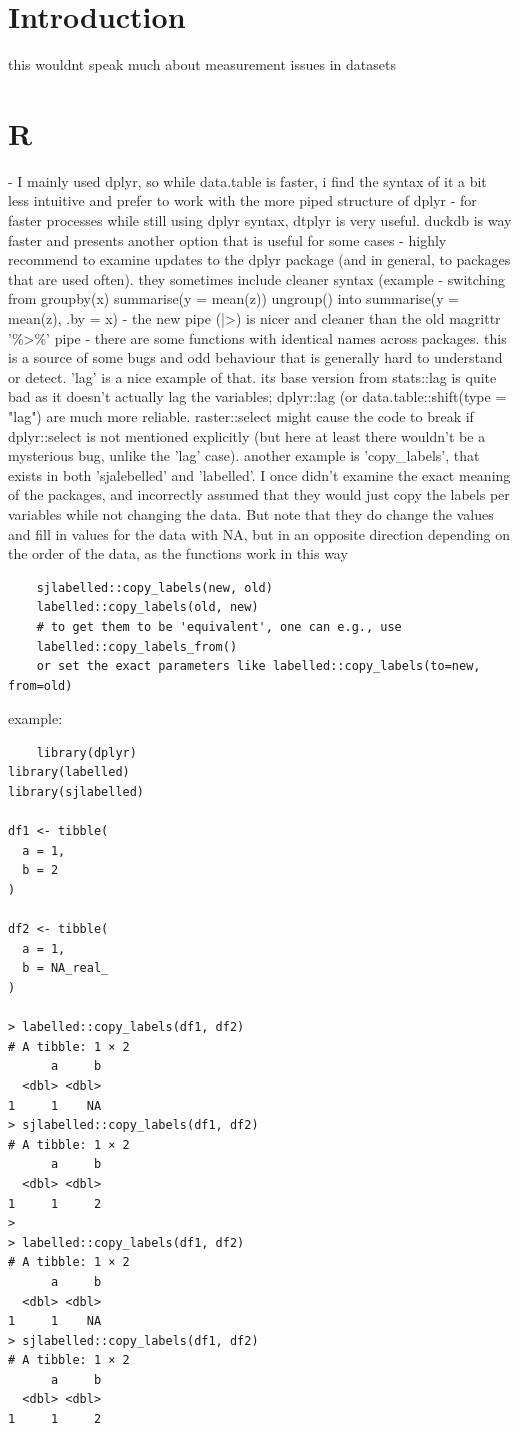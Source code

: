 
\section{Introduction}

this wouldnt speak much about measurement issues in datasets

\section{R}

- I mainly used dplyr, so while data.table is faster, i find the syntax of it a bit less intuitive and prefer to work with the more piped structure of dplyr
- for faster processes while still using dplyr syntax, dtplyr is very useful. duckdb is way faster and presents another option that is useful for some cases
- highly recommend to examine updates to the dplyr package (and in general, to packages that are used often). they sometimes include cleaner syntax (example - switching from groupby(x) summarise(y = mean(z)) ungroup() into summarise(y = mean(z), .by = x)
- the new pipe (|>) is nicer and cleaner than the old magrittr '\%>\%' pipe
- there are some functions with identical names across packages. this is a source of some bugs and odd behaviour that is generally hard to understand or detect. 'lag' is a nice example of that. its base version from stats::lag is quite bad as it doesn't actually lag the variables; dplyr::lag (or data.table::shift(type = "lag") are much more reliable. raster::select might cause the code to break if dplyr::select is not mentioned explicitly (but here at least there wouldn't be a mysterious bug, unlike the 'lag' case). another example is 'copy\_labels', that exists in both 'sjalebelled' and 'labelled'. I once didn't examine the exact meaning of the packages, and incorrectly assumed that they would just copy the labels per variables while not changing the data.
But note that they do change the values and fill in values for the data with NA, but in an opposite direction depending on the order of the data, as the functions work in this way
\begin{verbatim}
    sjlabelled::copy_labels(new, old)
    labelled::copy_labels(old, new)
    # to get them to be 'equivalent', one can e.g., use
    labelled::copy_labels_from()
    or set the exact parameters like labelled::copy_labels(to=new, from=old) 
\end{verbatim}
example:
\begin{verbatim}
    library(dplyr)
library(labelled)
library(sjlabelled)

df1 <- tibble(
  a = 1,
  b = 2
) 

df2 <- tibble(
  a = 1,
  b = NA_real_
)

> labelled::copy_labels(df1, df2)
# A tibble: 1 × 2
      a     b
  <dbl> <dbl>
1     1    NA
> sjlabelled::copy_labels(df1, df2)
# A tibble: 1 × 2
      a     b
  <dbl> <dbl>
1     1     2
> 
> labelled::copy_labels(df1, df2)
# A tibble: 1 × 2
      a     b
  <dbl> <dbl>
1     1    NA
> sjlabelled::copy_labels(df1, df2)
# A tibble: 1 × 2
      a     b
  <dbl> <dbl>
1     1     2

\end{verbatim}

